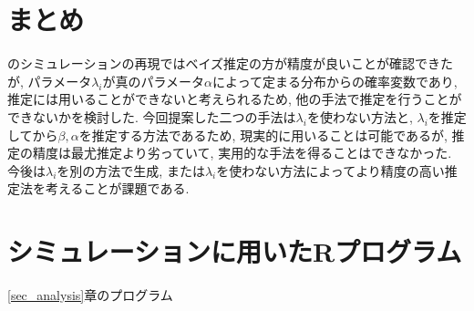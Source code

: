\documentclass[titlepage,twoside]{jarticle}
\theoremstyle{definition}
\begin{document}
\section{まとめ}

\cite{Lomax2020}のシミュレーションの再現ではベイズ推定の方が精度が良いことが確認できたが, パラメータ$\lambda_i$が真のパラメータ$\alpha$によって定まる分布からの確率変数であり, 推定には用いることができないと考えられるため, 他の手法で推定を行うことができないかを検討した. 今回提案した二つの手法は$\lambda_i$を使わない方法と, $\lambda_i$を推定してから$\beta,\alpha$を推定する方法であるため, 現実的に用いることは可能であるが, 推定の精度は最尤推定より劣っていて, 実用的な手法を得ることはできなかった. 今後は$\lambda_i$を別の方法で生成, または$\lambda_i$を使わない方法によってより精度の高い推定法を考えることが課題である.

\section{シミュレーションに用いたRプログラム}

\ref{sec_analysis}章のプログラム
\end{document}
